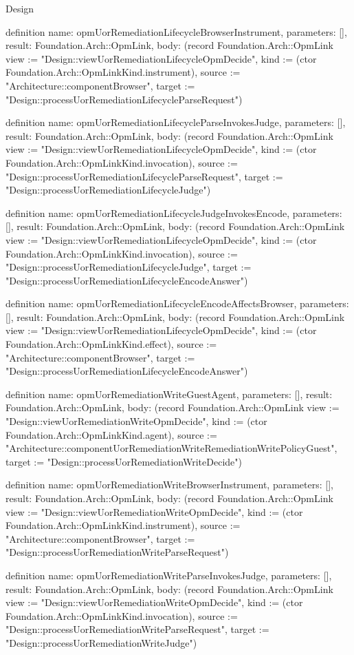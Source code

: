\begin{lexlean}{Design}
\begin{semanticmodule}
definition{
  name: opmUorRemediationLifecycleBrowserInstrument,
  parameters: [],
  result: Foundation.Arch::OpmLink,
  body: (record Foundation.Arch::OpmLink {view := "Design::viewUorRemediationLifecycleOpmDecide", kind := (ctor Foundation.Arch::OpmLinkKind.instrument), source := "Architecture::componentBrowser", target := "Design::processUorRemediationLifecycleParseRequest"})
}

definition{
  name: opmUorRemediationLifecycleParseInvokesJudge,
  parameters: [],
  result: Foundation.Arch::OpmLink,
  body: (record Foundation.Arch::OpmLink {view := "Design::viewUorRemediationLifecycleOpmDecide", kind := (ctor Foundation.Arch::OpmLinkKind.invocation), source := "Design::processUorRemediationLifecycleParseRequest", target := "Design::processUorRemediationLifecycleJudge"})
}

definition{
  name: opmUorRemediationLifecycleJudgeInvokesEncode,
  parameters: [],
  result: Foundation.Arch::OpmLink,
  body: (record Foundation.Arch::OpmLink {view := "Design::viewUorRemediationLifecycleOpmDecide", kind := (ctor Foundation.Arch::OpmLinkKind.invocation), source := "Design::processUorRemediationLifecycleJudge", target := "Design::processUorRemediationLifecycleEncodeAnswer"})
}

definition{
  name: opmUorRemediationLifecycleEncodeAffectsBrowser,
  parameters: [],
  result: Foundation.Arch::OpmLink,
  body: (record Foundation.Arch::OpmLink {view := "Design::viewUorRemediationLifecycleOpmDecide", kind := (ctor Foundation.Arch::OpmLinkKind.effect), source := "Architecture::componentBrowser", target := "Design::processUorRemediationLifecycleEncodeAnswer"})
}

definition{
  name: opmUorRemediationWriteGuestAgent,
  parameters: [],
  result: Foundation.Arch::OpmLink,
  body: (record Foundation.Arch::OpmLink {view := "Design::viewUorRemediationWriteOpmDecide", kind := (ctor Foundation.Arch::OpmLinkKind.agent), source := "Architecture::componentUorRemediationWriteRemediationWritePolicyGuest", target := "Design::processUorRemediationWriteDecide"})
}

definition{
  name: opmUorRemediationWriteBrowserInstrument,
  parameters: [],
  result: Foundation.Arch::OpmLink,
  body: (record Foundation.Arch::OpmLink {view := "Design::viewUorRemediationWriteOpmDecide", kind := (ctor Foundation.Arch::OpmLinkKind.instrument), source := "Architecture::componentBrowser", target := "Design::processUorRemediationWriteParseRequest"})
}

definition{
  name: opmUorRemediationWriteParseInvokesJudge,
  parameters: [],
  result: Foundation.Arch::OpmLink,
  body: (record Foundation.Arch::OpmLink {view := "Design::viewUorRemediationWriteOpmDecide", kind := (ctor Foundation.Arch::OpmLinkKind.invocation), source := "Design::processUorRemediationWriteParseRequest", target := "Design::processUorRemediationWriteJudge"})
}


\end{semanticmodule}
\end{lexlean}
